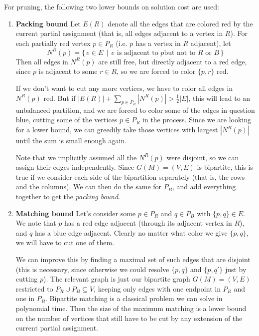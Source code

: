 \documentclass{article}
\begin{document}
	For pruning, the following two lower bounds on solution cost are used:
	\begin{enumerate}
		\item[] \textbf{Packing bound} Let $E(R)$ denote all the edges that
				are colored red by the current partial assignment (that is, all
				edges adjacent to a vertex in $R$).
				For each partially red vertex
				$p \in P_R$ (i.e. $p$ has a vertex in $R$ adjacent), let
				$$N^R(p) = \{\, e \in E \,\mid\, \text{$e$ is adjacent to $p$
				but not to $R$ or $B$}\,\}$$
				Then all edges in $N^R(p)$ are still free, but directly
				adjacent to a red edge, since $p$ is adjacent to some $r\in R$,
				so we are forced to color $\{p, r\}$ red.

				If we don't want to cut any more vertices, we have to color all
				edges in $N^R(p)$ red. But if
				$|E(R)| + \sum_{p\in P_R} |N^R(p)| > \frac{1}{2}|E|$, this will
				lead to an unbalanced partition, and we are forced to color
				some of the edges in question blue, cutting some
				of the vertices $p \in P_R$ in the process.
				Since we are looking for a lower
				bound, we can greedily take those vertices with largest
				$|N^R(p)|$ until the sum is small enough again.

				Note that we implicitly assumed all the $N^R(p)$ were disjoint,
				so we can assign their edges independently. Since
				$G(M) = (V,E)$ is bipartite, this is true if we consider each
				side of the bipartition separately (that is, the rows and the
				columns). We can then do the same
				for $P_B$, and add everything together to get the
				\textit{packing bound}.
		\item[] \textbf{Matching bound} Let's consider some $p \in P_R$ and
				$q \in P_B$ with $\{p, q\} \in E$. We note that $p$ has a red
				edge adjacent (through its adjacent vertex in $R$), and $q$ has
				a blue edge adjacent. Clearly no matter what color we give
				$\{p, q\}$, we will have to cut one of them.

				We can improve this by finding a maximal set of such edges that
				are disjoint (this is necessary, since otherwise we could
				resolve $\{p, q\}$ and $\{p, q'\}$ just by cutting $p$).
				The relevant graph is just our bipartite graph
				$G(M) = (V, E)$ restricted to
				$P_R \cup P_B \subseteq V$, keeping only edges with one
				endpoint in $P_R$ and one in $P_B$. Bipartite
				matching is a classical problem we can solve in polynomial
				time. Then the size of the maximum matching is a lower bound
				on the number of vertices that still have to be cut by any
				extension of the current partial assignment.
	\end{enumerate}
\end{document}
